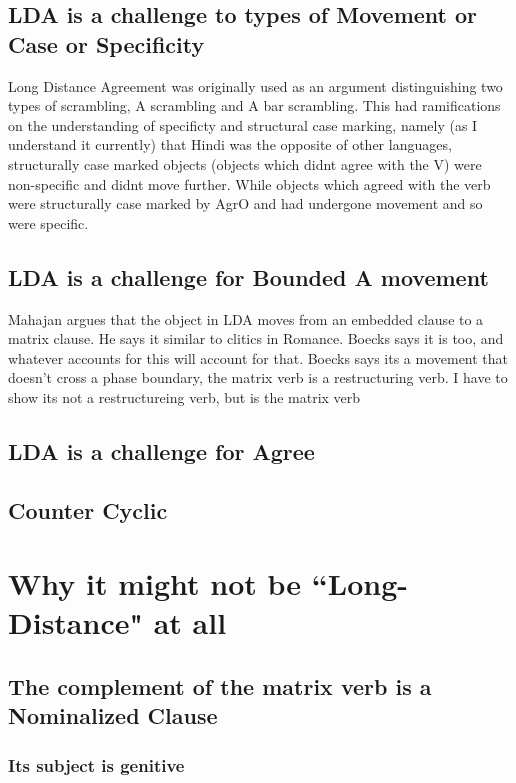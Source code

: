 \documentclass{article}
\begin{document}
\subsection{LDA is a challenge to types of Movement or Case or Specificity}
Long Distance Agreement was originally used as an argument distinguishing two types of scrambling, A scrambling and A bar scrambling. This had ramifications on the understanding of specificty and structural case marking, namely (as I understand it currently) that Hindi was the opposite of other languages, structurally case marked objects (objects which didnt agree with the V) were non-specific and didnt move further. While objects which agreed with the verb were structurally case marked by AgrO and had undergone movement and so were specific. 

\subsection{LDA is a challenge for Bounded A movement}
Mahajan argues that the object in LDA moves from an embedded clause to a matrix clause. He says it similar to clitics in Romance. Boecks says  it is too, and whatever accounts for this will account for that. Boecks says its a movement that doesn't cross a phase boundary, the matrix verb is a restructuring verb. I have to show its not a restructureing verb, but is the matrix verb

\subsection{LDA is a challenge for Agree}
\subsection{Counter Cyclic}

\section{Why it might not be ``Long-Distance" at all}

\subsection{The complement of the matrix verb is a Nominalized Clause}

\subsubsection{Its subject is genitive}
\end{document}
